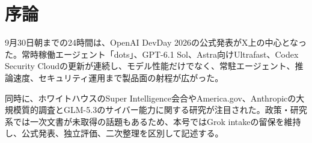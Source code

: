 \section*{序論}
9月30日朝までの24時間は、OpenAI DevDay 2026の公式発表がX上の中心となった。常時稼働エージェント「dots」、GPT-6.1 Sol、Astra向けUltrafast、Codex Security Cloudの更新が連続し、モデル性能だけでなく、常駐エージェント、推論速度、セキュリティ運用まで製品面の射程が広がった。

同時に、ホワイトハウスのSuper Intelligence会合やAmerica.gov、Anthropicの大規模質的調査とGLM-5.3のサイバー能力に関する研究が注目された。政策・研究系では一次文書が未取得の話題もあるため、本号ではGrok intakeの留保を維持し、公式発表、独立評価、二次整理を区別して記述する。
